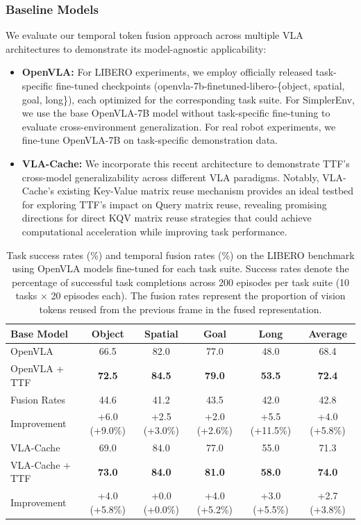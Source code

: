 \documentclass[letterpaper]{article}
\begin{document}
\subsubsection{Baseline Models} We evaluate our temporal token fusion approach across multiple VLA architectures to demonstrate its model-agnostic applicability:
\begin{itemize}
\item \textbf{OpenVLA:} For LIBERO experiments, we employ officially released task-specific fine-tuned checkpoints (openvla-7b-finetuned-libero-\{object, spatial, goal, long\}), each optimized for the corresponding task suite. For SimplerEnv, we use the base OpenVLA-7B model without task-specific fine-tuning to evaluate cross-environment generalization. For real robot experiments, we fine-tune OpenVLA-7B on task-specific demonstration data.
\item \textbf{VLA-Cache:} We incorporate this recent architecture to demonstrate TTF's cross-model generalizability across different VLA paradigms. Notably, VLA-Cache's existing Key-Value matrix reuse mechanism provides an ideal testbed for exploring TTF's impact on Query matrix reuse, revealing promising directions for direct KQV matrix reuse strategies that could achieve computational acceleration while improving task performance.
\end{itemize}


\begin{table}[t]
\centering
\small
\begin{tabular}{l|cccc|c}
\hline
Base Model & Object & Spatial & Goal & Long & Average \\
\hline
OpenVLA & 66.5 & 82.0 & 77.0 & 48.0 & 68.4 \\
OpenVLA + TTF & \textbf{72.5} & \textbf{84.5} & \textbf{79.0} & \textbf{53.5} & \textbf{72.4} \\
Fusion Rates & 44.6 & 41.2 & 43.5 & 42.0 & 42.8 \\
Improvement & +6.0 (+9.0\%) & +2.5 (+3.0\%) & +2.0 (+2.6\%) & +5.5 (+11.5\%) & +4.0 (+5.8\%) \\
\hline
VLA-Cache & 69.0 & 84.0 & 77.0 & 55.0 & 71.3 \\
VLA-Cache + TTF & \textbf{73.0} & \textbf{84.0} & \textbf{81.0} & \textbf{58.0} & \textbf{74.0} \\
Improvement & +4.0 (+5.8\%) & +0.0 (+0.0\%) & +4.0 (+5.2\%) & +3.0 (+5.5\%) & +2.7 (+3.8\%) \\
\hline
\end{tabular}
\caption{Task success rates (\%) and temporal fusion rates (\%) on the LIBERO benchmark using OpenVLA models fine-tuned for each task suite. Success rates denote the percentage of successful task completions across 200 episodes per task suite (10 tasks × 20 episodes each). The fusion rates represent the proportion of vision tokens reused from the previous frame in the fused representation.}
\label{tab:libero_results}
\end{table}
\end{document}

